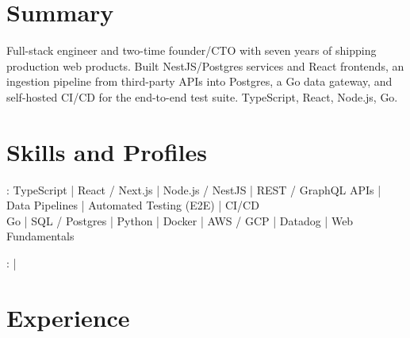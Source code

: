 \documentclass[print]{jack-resume}
\begin{document}
\pagecolor{darkmodeBackground}


\begin{minipage}[t][1cm][t]{.03\textwidth}
    \hfill
\end{minipage}

\section{Summary}
Full-stack engineer and two-time founder/CTO with seven years of shipping production web products. Built NestJS/Postgres services and React frontends, an ingestion pipeline from third-party APIs into Postgres, a Go data gateway, and self-hosted CI/CD for the end-to-end test suite. TypeScript, React, Node.js, Go.
\sectionsep

\section{Skills and Profiles}
:
TypeScript \hfill | \hfill
React / Next.js \hfill | \hfill
Node.js / NestJS \hfill | \hfill
REST / GraphQL APIs \hfill | \hfill
Data Pipelines \hfill | \hfill
Automated Testing (E2E) \hfill | \hfill
CI/CD \\
\hspace{1.0cm} Go \hfill | \hfill
SQL / Postgres \hfill | \hfill
Python \hfill | \hfill
Docker \hfill | \hfill
AWS / GCP \hfill | \hfill
Datadog \hfill | \hfill
Web Fundamentals \\

\raggedright{
    :
      \href{https://www.linkedin.com/in/jack-sturtevant/}{ \ExternalLink} |
     \href{https://github.com/jacksturt}{ \ExternalLink}}

\section{Experience}
\end{document}
